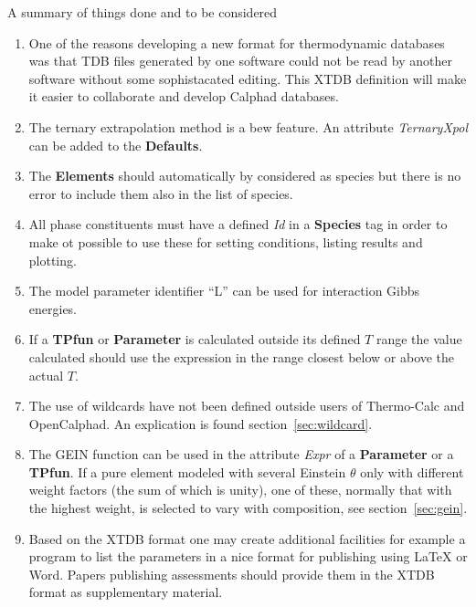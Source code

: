 \documentclass{article}
\begin{document}
A summary of things done and to be considered

\begin{enumerate}
\item One of the reasons developing a new format for thermodynamic
  databases was that TDB files generated by one software could not be
  read by another software without some sophistacated editing.  
  This XTDB definition will make it easier to collaborate and
  develop Calphad databases.

\item The ternary extrapolation method is a bew feature.  An attribute
  {\em TernaryXpol} can be added to the {\bf Defaults}.

\item The {\bf Elements} should automatically by considered as species but
  there is no error to include them also in the list of species.

\item All phase constituents must have a defined {\em Id} in a {\bf
  Species} tag in order to make ot possible to use these for setting
  conditions, listing results and plotting.

\item The model parameter identifier ``L'' can be used for interaction
  Gibbs energies.

\item If a {\bf TPfun} or {\bf Parameter} is calculated outside its
  defined $T$ range the value calculated should use the
  expression in the range closest below or above the actual $T$. 

\item The use of wildcards have not been defined outside users of
  Thermo-Calc and OpenCalphad.  An explication is found
  section~\ref{sec:wildcard}.

\item The GEIN function can be used in the attribute {\em Expr} of a
  {\bf Parameter} or a {\bf TPfun}.  If a pure element modeled with
  several Einstein $\theta$ only with different weight factors (the
  sum of which is unity), one of these, normally that with the highest
  weight, is selected to vary with composition, see
  section~\ref{sec:gein}.

\item Based on the XTDB format one may create additional facilities
  for example a program to list the parameters in a nice format for
  publishing using LaTeX or Word.  Papers publishing assessments
  should provide them in the XTDB format as supplementary material.


\end{enumerate}
\end{document}
